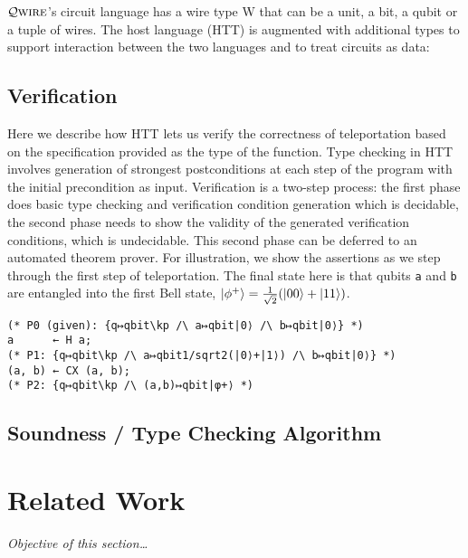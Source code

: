 \documentclass[acmsmall,nonacm,timestamp]{acmart}
\newcommand{\qwire}{\ensuremath{\mathcal{Q}\textsc{wire}}\xspace}
\begin{document}
\qwire's circuit language has a wire type W that can be a unit, a bit, a qubit or a tuple of wires. The host language (HTT) is augmented with additional types to support interaction between the two languages and to treat circuits as data:

\subsection{Verification}
Here we describe how HTT lets us verify the correctness of teleportation based on the specification provided as the type of the function. Type checking in HTT involves generation of strongest postconditions at each step of the program with the initial precondition as input. Verification is a two-step process: the first phase does basic type checking and verification condition generation which is decidable, the second phase needs to show the validity of the generated verification conditions, which is undecidable. This second phase can be deferred to an automated theorem prover. For illustration, we show the assertions as we step through the first step of teleportation. The final state here is that qubits \lstinline{a} and \lstinline{b} are entangled into the first Bell state, $\ket{\phi^+} = \frac{1}{\sqrt{2}}(\ket{00} + \ket{11})$.

\begin{lstlisting}
(* P0 (given): {q↦qbit\kp /\ a↦qbit|0⟩ /\ b↦qbit|0⟩} *)
a      ← H a;
(* P1: {q↦qbit\kp /\ a↦qbit1/sqrt2(|0⟩+|1⟩) /\ b↦qbit|0⟩} *)
(a, b) ← CX (a, b);
(* P2: {q↦qbit\kp /\ (a,b)↦qbit|φ+⟩ *)
\end{lstlisting}

\subsection{Soundness / Type Checking Algorithm}

\section{Related Work}
\textit{Objective of this section\ldots}
\end{document}
